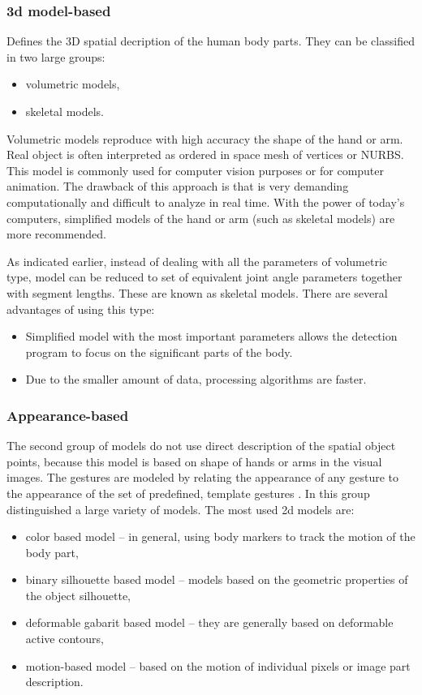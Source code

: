 \subsubsection{3d model-based}

Defines the 3D spatial decription of the human body parts. They can be classified in two large groups:
\begin{itemize}
\item volumetric models,
\item skeletal models.
\end{itemize}
Volumetric models reproduce with high accuracy the shape of the hand or arm. Real object is often interpreted as ordered in space mesh of vertices or NURBS. This model is commonly used for computer vision purposes or for computer animation. The drawback of this approach is that is very demanding computationally and difficult to analyze in real time. With the power of today’s computers, simplified models of the hand or arm (such as skeletal models) are more recommended.

As indicated earlier, instead of dealing with all the parameters of volumetric type, model can be reduced to set of equivalent joint angle parameters together with segment lengths. These are known as skeletal models. There are several advantages of using this type:
\begin{itemize}
\item Simplified model with the most important parameters allows the detection program to focus on the significant parts of the body.
\item Due to the smaller amount of data, processing algorithms are faster.
\end{itemize}

\subsubsection{Appearance-based}

The second group of models do not use direct description of the spatial object points, because this model is based on shape of hands or arms in the visual images. The gestures are modeled by relating the appearance of any gesture to the appearance of the set of predefined, template gestures \cite{Pavlovic97visualinterpretation}. In this group distinguished a large variety of models. The most used 2d models are:
\begin{itemize}
\item color based model -- in general, using body markers to track the motion of the body part,
\item binary silhouette based model -- models based on the geometric properties of the object silhouette,
\item deformable gabarit based model -- they are generally based on deformable active contours,
\item motion-based model -- based on the motion of individual pixels or image part description.
\end{itemize}

